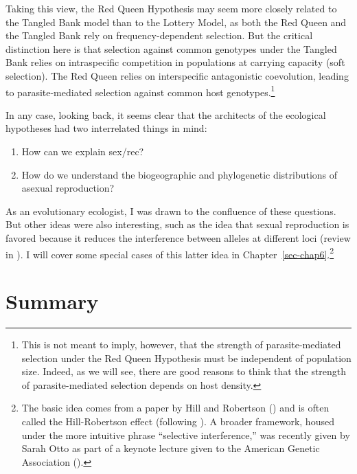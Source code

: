 \documentclass[
  letterpaper,
]{book}
\providecommand{\tightlist}{%
  \setlength{\itemsep}{0pt}\setlength{\parskip}{0pt}}\usepackage{longtable,booktabs,array}
\begin{document}
Taking this view, the Red Queen Hypothesis may seem more closely related
to the Tangled Bank model than to the Lottery Model, as both the Red
Queen and the Tangled Bank rely on frequency-dependent selection. But
the critical distinction here is that selection against common genotypes
under the Tangled Bank relies on intraspecific competition in
populations at carrying capacity (soft selection). The Red Queen relies
on interspecific antagonistic coevolution, leading to parasite-mediated
selection against common host genotypes.\footnote{This is not meant to
  imply, however, that the strength of parasite-mediated selection under
  the Red Queen Hypothesis must be independent of population size.
  Indeed, as we will see, there are good reasons to think that the
  strength of parasite-mediated selection depends on host density.}

In any case, looking back, it seems clear that the architects of the
ecological hypotheses had two interrelated things in mind:

\begin{enumerate}
\def\labelenumi{\arabic{enumi}.}
\tightlist
\item
  How can we explain sex/rec?
\item
  How do we understand the biogeographic and phylogenetic distributions
  of asexual reproduction?
\end{enumerate}

As an evolutionary ecologist, I was drawn to the confluence of these
questions. But other ideas were also interesting, such as the idea that
sexual reproduction is favored because it reduces the interference
between alleles at different loci (review in
). I will cover some special cases of
this latter idea in Chapter~\ref{sec-chap6}.\footnote{The basic idea
  comes from a paper by Hill and Robertson
  () and is often called the
  Hill-Robertson effect (following
  ). A broader
  framework, housed under the more intuitive phrase ``selective
  interference,'' was recently given by Sarah Otto as part of a keynote
  lecture given to the American Genetic Association
  ().}

\section{Summary}\label{summary-1}
\end{document}
